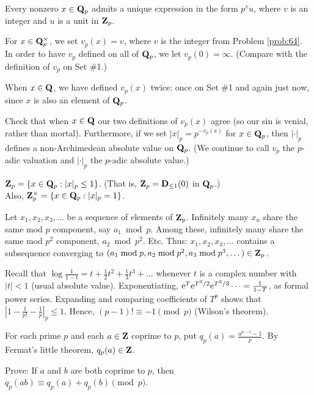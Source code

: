 \begin{prob}\label{prob:64} Every nonzero $x \in \mathbf{Q}_p$ admits a unique expression in the form $p^v u$, where $v$ is an integer and $u$ is a unit in $\Z_p$. \end{prob}

For $x \in \mathbf{Q}_p^{\times}$, we set $v_p(x)=v$, where $v$ is the integer from Problem \ref{prob:64}. In order to have $v_p$ defined on all of $\mathbf{Q}_p$, we let $v_p(0)=\infty$. (Compare with the definition of $v_p$ on Set \#1.)

\begin{prob}\label{prob:65} When $x \in \mathbf{Q}$, we have defined $v_p(x)$ twice: once on Set \#1 and again just now, since $x$ is also an element of $\mathbf{Q}_p$. 

Check that when $x \in \mathbf{Q}$ our two definitions of $v_p(x)$ agree (so our sin is venial, rather than mortal). Furthermore, if we set $|x|_p = p^{-v_p(x)}$ for $x \in \mathbf{Q}_p$, then $|\cdot|_p$ defines a non-Archimedean absolute value on $\mathbf{Q}_p$. (We continue to call $v_p$ the \textsf{$p$-adic valuation} and $|\cdot|_p$ the \textsf{$p$-adic absolute value}.)
\end{prob}

\begin{prob}\label{prob:66} $\mathbf{Z}_p = \{x \in \mathbf{Q}_p: |x|_p \le 1\}$. (That is, $\mathbf{Z}_p=\mathbf{D}_{\le 1}(0)$ in $\mathbf{Q}_p$.) \\
Also, $\mathbf{Z}_p^{\times} = \{x \in \mathbf{Q}_p: |x|_p = 1\}$.
\end{prob}
\begin{prob}[$\Z_p$ is compact]\label{prob:67}\label{prob:zpcompact} Let $x_1, x_2, x_3, \dots$ be a sequence of elements of $\Z_p$. Infinitely many $x_n$ share the same mod $p$ component, say $a_1\bmod{p}$. Among these, infinitely many share the same mod $p^2$ component, $a_2\bmod{p^2}$. Etc. Thus:      $x_1,x_2,x_3,\dots$ contains a subsequence converging to $(a_1\bmod{p}, a_2\bmod{p^2}, a_3\bmod{p^3}, \dots) \in \mathbf{Z}_p$. 
\end{prob}




\curious

\begin{prob}[Stern]\label{prob:71} Recall that $\log\frac{1}{1-t} = t+\frac{1}{2}t^2 +\frac{1}{3}t^3+  \dots$ whenever $t$ is a complex number with $|t| < 1$ (usual absolute value). Exponentiating, $\mathrm{e}^{T} \mathrm{e}^{T^2/2} \mathrm{e}^{T^3/3} \cdots =\frac{1}{1-T}$, as formal power series. Expanding and comparing coefficients of $T^p$ shows that $|1 - \frac{1}{p!} - \frac{1}{p}|_{p} \le 1$. Hence, $(p-1)!\equiv -1\pmod{p}$ (\textsf{Wilson's theorem}).
\end{prob}


\begin{prob}\label{prob:72} For each prime $p$ and each $a\in \mathbf{Z}$ coprime to $p$, put $q_p(a) = \frac{a^{p-1}-1}{p}$. By Fermat's little theorem, $q_p(a) \in \mathbf{Z}$. 

Prove: If $a$ and $b$ are both coprime to $p$, then $q_p(ab) \equiv q_p(a) + q_p(b) \pmod{p}$.
\end{prob}








